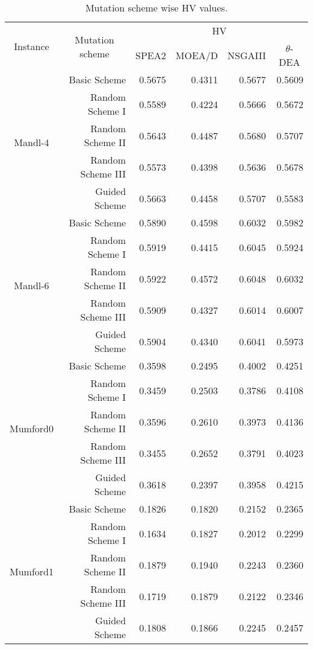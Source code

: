 \begin{table}[!htbp]
	\centering
	\caption{Mutation scheme wise HV values.}
	\begin{tabular}{|c|r|r|r|r|r|}
		\hline
		\multirow{2}[4]{*}{Instance} & \multicolumn{1}{c|}{\multirow{2}[4]{*}{Mutation scheme}} & \multicolumn{4}{c|}{HV} \\
		\cline{3-6}          & \multicolumn{1}{c|}{} & \multicolumn{1}{c|}{SPEA2} & \multicolumn{1}{c|}{MOEA/D} & \multicolumn{1}{c|}{NSGAIII} & \multicolumn{1}{c|}{$\theta$-DEA} \\
		\hline
		\multirow{5}[10]{*}{Mandl-4} & Basic Scheme & 0.5675 & 0.4311 & 0.5677 & 0.5609 \\
		\cline{2-6}          & Random Scheme I & 0.5589 & 0.4224 & 0.5666 & 0.5672 \\
		\cline{2-6}          & Random Scheme II & 0.5643 & 0.4487 & 0.5680 & 0.5707 \\
		\cline{2-6}          & Random Scheme III & 0.5573 & 0.4398 & 0.5636 & 0.5678 \\
		\cline{2-6}          & Guided Scheme & 0.5663 & 0.4458 & 0.5707 & 0.5583 \\
		\hline
		\multirow{5}[10]{*}{Mandl-6} & Basic Scheme & 0.5890 & 0.4598 & 0.6032 & 0.5982 \\
		\cline{2-6}          & Random Scheme I & 0.5919 & 0.4415 & 0.6045 & 0.5924 \\
		\cline{2-6}          & Random Scheme II & 0.5922 & 0.4572 & 0.6048 & 0.6032 \\
		\cline{2-6}          & Random Scheme III & 0.5909 & 0.4327 & 0.6014 & 0.6007 \\
		\cline{2-6}          & Guided Scheme & 0.5904 & 0.4340 & 0.6041 & 0.5973 \\
		\hline
		\multirow{5}[10]{*}{Mumford0} & Basic Scheme & 0.3598 & 0.2495 & 0.4002 & 0.4251 \\
		\cline{2-6}          & Random Scheme I & 0.3459 & 0.2503 & 0.3786 & 0.4108 \\
		\cline{2-6}          & Random Scheme II & 0.3596 & 0.2610 & 0.3973 & 0.4136 \\
		\cline{2-6}          & Random Scheme III & 0.3455 & 0.2652 & 0.3791 & 0.4023 \\
		\cline{2-6}          & Guided Scheme & 0.3618 & 0.2397 & 0.3958 & 0.4215 \\
		\hline
		\multirow{5}[10]{*}{Mumford1} & Basic Scheme & 0.1826 & 0.1820 & 0.2152 & 0.2365 \\
		\cline{2-6}          & Random Scheme I & 0.1634 & 0.1827 & 0.2012 & 0.2299 \\
		\cline{2-6}          & Random Scheme II & 0.1879 & 0.1940 & 0.2243 & 0.2360 \\
		\cline{2-6}          & Random Scheme III & 0.1719 & 0.1879 & 0.2122 & 0.2346 \\
		\cline{2-6}          & Guided Scheme & 0.1808 & 0.1866 & 0.2245 & 0.2457 \\
		\hline
	\end{tabular}%
	\label{tab:mutwise_hv}%
\end{table}%


